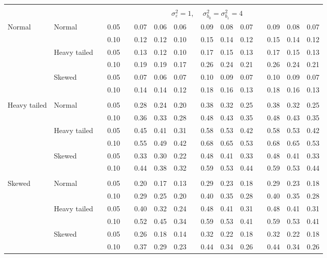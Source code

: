 \documentclass[11pt]{article} %
\begin{document}
\begin{table}[ht]
\begin{scriptsize}
\begin{center}
\begin{tabular}{ll p{.1cm} c p{.1cm} rrr p{.1cm} rrr p{.1cm} rrr}
&&&&&&&&&&&&&&&\\
& && && \multicolumn{9}{c}{$\sigma_{\varepsilon}^2 = 1$, \ \ $\sigma_{b_0}^2 = \sigma_{b_1}^2 = 4$} \\ \cline{6-16}
Normal       & Normal       && 0.05 &&  0.07 & 0.06 & 0.06 && 0.09 & 0.08 & 0.07 && 0.09 & 0.08 & 0.07 \\ 
             &              && 0.10 &&  0.12 & 0.12 & 0.10 && 0.15 & 0.14 & 0.12 && 0.15 & 0.14 & 0.12 \\ 
             & Heavy tailed && 0.05 &&  0.13 & 0.12 & 0.10 && 0.17 & 0.15 & 0.13 && 0.17 & 0.15 & 0.13 \\ 
             &              && 0.10 &&  0.19 & 0.19 & 0.17 && 0.26 & 0.24 & 0.21 && 0.26 & 0.24 & 0.21 \\ 
             & Skewed       && 0.05 &&  0.07 & 0.06 & 0.07 && 0.10 & 0.09 & 0.07 && 0.10 & 0.09 & 0.07 \\ 
             &              && 0.10 &&  0.14 & 0.14 & 0.12 && 0.18 & 0.16 & 0.13 && 0.18 & 0.16 & 0.13 \\ 
             &&&&&&&&&&&&&&&\\
Heavy tailed & Normal       && 0.05 &&  0.28 & 0.24 & 0.20 && 0.38 & 0.32 & 0.25 && 0.38 & 0.32 & 0.25 \\ 
             &              && 0.10 &&  0.36 & 0.33 & 0.28 && 0.48 & 0.43 & 0.35 && 0.48 & 0.43 & 0.35 \\ 
             & Heavy tailed && 0.05 &&  0.45 & 0.41 & 0.31 && 0.58 & 0.53 & 0.42 && 0.58 & 0.53 & 0.42 \\ 
             &              && 0.10 &&  0.55 & 0.49 & 0.42 && 0.68 & 0.65 & 0.53 && 0.68 & 0.65 & 0.53 \\ 
             & Skewed       && 0.05 &&  0.33 & 0.30 & 0.22 && 0.48 & 0.41 & 0.33 && 0.48 & 0.41 & 0.33 \\ 
             &              && 0.10 &&  0.44 & 0.38 & 0.32 && 0.59 & 0.53 & 0.44 && 0.59 & 0.53 & 0.44 \\ 
             &&&&&&&&&&&&&&&\\
Skewed       & Normal       && 0.05 &&  0.20 & 0.17 & 0.13 && 0.29 & 0.23 & 0.18 && 0.29 & 0.23 & 0.18 \\ 
             &              && 0.10 &&  0.29 & 0.25 & 0.20 && 0.40 & 0.35 & 0.28 && 0.40 & 0.35 & 0.28 \\ 
             & Heavy tailed && 0.05 &&  0.40 & 0.32 & 0.24 && 0.48 & 0.41 & 0.31 && 0.48 & 0.41 & 0.31 \\ 
             &              && 0.10 &&  0.52 & 0.45 & 0.34 && 0.59 & 0.53 & 0.41 && 0.59 & 0.53 & 0.41 \\ 
             & Skewed       && 0.05 &&  0.26 & 0.18 & 0.14 && 0.32 & 0.22 & 0.18 && 0.32 & 0.22 & 0.18 \\ 
             &              && 0.10 &&  0.37 & 0.29 & 0.23 && 0.44 & 0.34 & 0.26 && 0.44 & 0.34 & 0.26 \\ 



\end{tabular}
\end{center}
\end{scriptsize}
\end{table}
\end{document}
